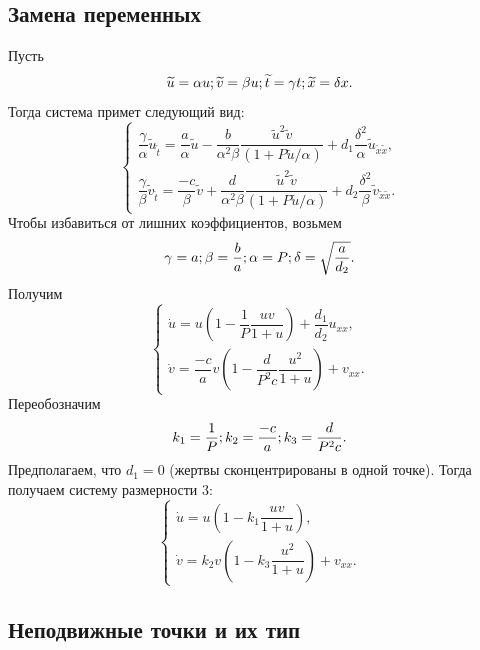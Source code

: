 \documentclass[oneside, final, 12pt]{article}
\begin{document}
\subsection{Замена переменных}
Пусть
\[
    \widetilde{u} = \alpha u;\\
    \widetilde{v} = \beta u;\\
    \widetilde{t} = \gamma t;\\
    \widetilde{x} = \delta x.
\]
Тогда система примет следующий вид:
\[
    \begin{cases}
        \dfrac{\gamma}{\alpha} \widetilde{u}_{\widetilde{t}} =
        \dfrac{a}{\alpha}\widetilde{u}
        - \dfrac{b}{\alpha^2\beta} \dfrac{\widetilde{u}^2\widetilde{v}}{(1 + P\widetilde{u}/\alpha)}
        + d_1\dfrac{\delta^2}{\alpha} \widetilde{u}_{\widetilde{x}\widetilde{x}}, \\

        \dfrac{\gamma}{\beta} \widetilde{v}_{\widetilde{t}} =
        \dfrac{-c}{\beta}\widetilde{v}
        + \dfrac{d}{\alpha^2\beta} \dfrac{\widetilde{u}^2\widetilde{v}}{(1 + P\widetilde{u}/\alpha)}
        + d_2\dfrac{\delta^2}{\beta} \widetilde{v}_{\widetilde{x}\widetilde{x}}.
    \end{cases}
\]
Чтобы избавиться от лишних коэффициентов, возьмем
\[
    \gamma = a;\\
    \beta = \dfrac{b}{a};\\
    \alpha = P;\\
    \delta = \sqrt{\dfrac{a}{d_2}}.
\]
Получим
\[
    \begin{cases}
        \dot{u} = u\left(1 - \dfrac{1}{P} \dfrac{uv}{1 + u}\right)  + \dfrac{d_1}{d_2}u_{xx}, \\
        \dot{v} = \dfrac{-c}{a} v\left(1 - \dfrac{d}{P^{2}c} \dfrac{u^2}{1 + u}\right) + v_{xx}.
    \end{cases}
\]
Переобозначим
\[
    k_1 = \dfrac{1}{P};\\
    k_2 = \dfrac{-c}{a};\\
    k_3 = \dfrac{d}{P^{2}c}.
\]
Предполагаем, что \(d_1 = 0\) (жертвы сконцентрированы в одной точке). Тогда получаем систему размерности 3:
\[
    \begin{cases}
        \dot{u} = u\left(1 -  k_1\dfrac{uv}{1 + u}\right) , \\
        \dot{v} = k_2 v\left(1 - k_3 \dfrac{u^2}{1 + u}\right) + v_{xx}.
    \end{cases}
\]

\subsection{Неподвижные точки и их тип}
\end{document}
